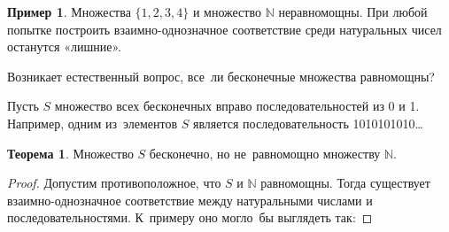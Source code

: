 \documentclass[pdftex, 12pt, a4paper]{article}
\def \mbb{\mathbb}
\def \N{\mbb N}
\theoremstyle{definition} %
\newtheorem{myex}{Пример}
\newtheorem{myth}{Теорема}
\numberwithin{problem}{section}
\numberwithin{blits}{section}
\begin{document}
\begin{myex} Множества $\{1,2,3,4\}$ и множество $\N$ неравномощны. При любой попытке построить взаимно-однозначное соответствие среди натуральных чисел останутся «лишние».
\end{myex}

Возникает естественный вопрос, все~ли бесконечные множества равномощны?


Пусть $S$ множество всех бесконечных вправо последовательностей из 0 и 1. Например, одним из~элементов $S$ является последовательность 1010101010\ldots


\begin{myth} Множество $S$ бесконечно, но не~равномощно множеству $\N$.
\end{myth}
\begin{proof} Допустим противоположное, что $S$ и $\N$ равномощны. Тогда существует взаимно-однозначное соответствие между натуральными числами и последовательностями. К~примеру оно могло~бы выглядеть так:



\end{proof}
\end{document}
